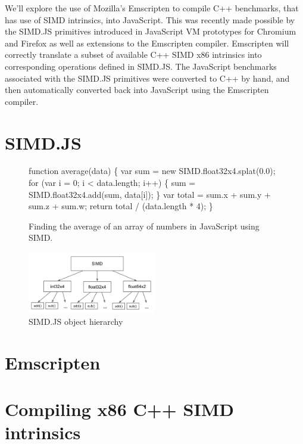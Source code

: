 \documentclass[preprint]{sigplanconf}
\begin{document}
We'll explore the use of Mozilla's Emscripten to compile C++ benchmarks, that has use of SIMD intrinsics,
into JavaScript.  This was recently made possible by the SIMD.JS primitives introduced in
JavaScript VM prototypes for Chromium and Firefox as well as extensions to the Emscripten 
compiler.  Emscripten will correctly translate a subset of available C++ SIMD x86 intrinsics into corresponding operations defined in SIMD.JS.
The JavaScript benchmarks associated with the SIMD.JS primitives were converted to C++ by hand,
and then automatically converted back into JavaScript using the Emscripten compiler.

\section{SIMD.JS}

\begin{figure}
\begin{small}
\begin{program}[style=tt, number=true]
fu\tab{}nction average(data) \{
  var sum = new SIMD.float32x4.splat(0.0);
  fo\tab{}r (var i = 0; i < data.length; i++) \{
    sum = SIMD.float32x4.add(sum, data[i]);\untab{}
  \}
  var total = sum.x + sum.y + sum.z + sum.w;
  return total / (data.length * 4);\untab{}
\}
\end{program}
\end{small}
\caption{Finding the average of an array of numbers in JavaScript using SIMD.}
\label{fig:simd-average}
\end{figure}

\begin{figure}
\begin{center}
\includegraphics[width=0.5\textwidth]{figures/hierarchy.png}
\end{center}
\caption{SIMD.JS object hierarchy}
\label{fig:hierarchy}
\end{figure}

\section{Emscripten}

\section{Compiling x86 C++ SIMD intrinsics}
\end{document}

